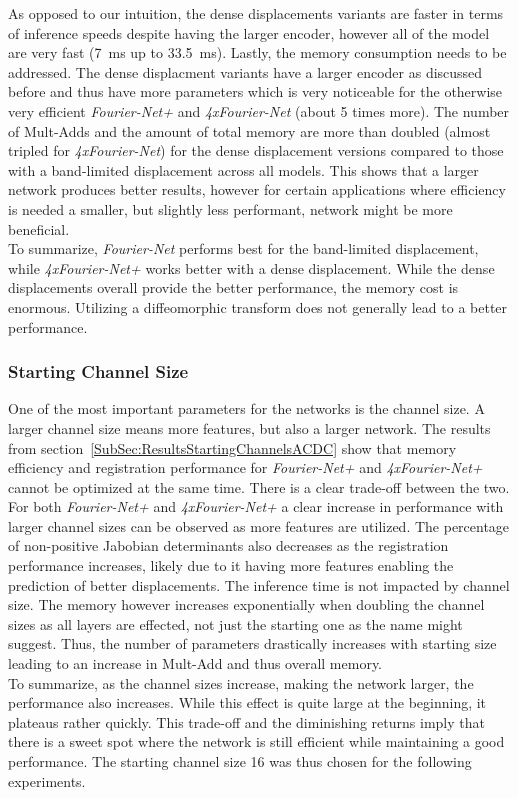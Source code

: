 As opposed to our intuition, the dense displacements variants are faster in terms of inference speeds despite having the larger encoder, however all of the model are very fast (7~ms up to 33.5~ms). Lastly, the memory consumption needs to be addressed. The dense displacment variants have a larger encoder as discussed before and thus have more parameters which is very noticeable for the otherwise very efficient \emph{Fourier-Net+} and \emph{4xFourier-Net} (about 5 times more). The number of Mult-Adds and the amount of total memory are more than doubled (almost tripled for \emph{4xFourier-Net}) for the dense displacement versions compared to those with a band-limited displacement across all models. This shows that a larger network produces better results, however for certain applications where efficiency is needed a smaller, but slightly less performant, network might be more beneficial.\\
To summarize, \emph{Fourier-Net} performs best for the band-limited displacement, while \emph{4xFourier-Net+} works better with a dense displacement. While the dense displacements overall provide the better performance, the memory cost is enormous. Utilizing a diffeomorphic transform does not generally lead to a better performance.

\subsubsection{Starting Channel Size} \label{SubSubSec:DiscussionStartingChannelsACDC}
One of the most important parameters for the networks is the channel size. A larger channel size means more features, but also a larger network. The results from section~\ref{SubSec:ResultsStartingChannelsACDC} show that memory efficiency and registration performance for \emph{Fourier-Net+} and \emph{4xFourier-Net+} cannot be optimized at the same time. There is a clear trade-off between the two. For both \emph{Fourier-Net+} and \emph{4xFourier-Net+} a clear increase in performance with larger channel sizes can be observed as more features are utilized. The percentage of non-positive Jabobian determinants also decreases as the registration performance increases, likely due to it having more features enabling the prediction of better displacements. The inference time is not impacted by channel size. The memory however increases exponentially when doubling the channel sizes as all layers are effected, not just the starting one as the name might suggest. Thus, the number of parameters drastically increases with starting size leading to an increase in Mult-Add and thus overall memory. \\
To summarize, as the channel sizes increase, making the network larger, the performance also increases. While this effect is quite large at the beginning, it plateaus rather quickly. This trade-off and the diminishing returns imply that there is a sweet spot where the network is still efficient while maintaining a good performance. The starting channel size 16 was thus chosen for the following experiments.

